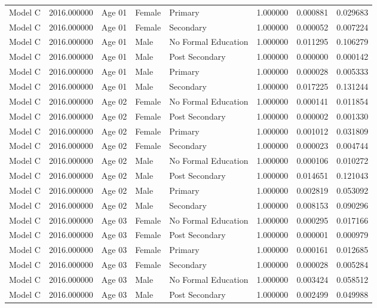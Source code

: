 \begin{table}[ht]
\begin{tabular}{lrlllrrr}
Model C & 2016.000000 & Age 01 & Female & Primary & 1.000000 & 0.000881 & 0.029683 \\
Model C & 2016.000000 & Age 01 & Female & Secondary & 1.000000 & 0.000052 & 0.007224 \\
Model C & 2016.000000 & Age 01 & Male & No Formal Education & 1.000000 & 0.011295 & 0.106279 \\
Model C & 2016.000000 & Age 01 & Male & Post Secondary & 1.000000 & 0.000000 & 0.000142 \\
Model C & 2016.000000 & Age 01 & Male & Primary & 1.000000 & 0.000028 & 0.005333 \\
Model C & 2016.000000 & Age 01 & Male & Secondary & 1.000000 & 0.017225 & 0.131244 \\
Model C & 2016.000000 & Age 02 & Female & No Formal Education & 1.000000 & 0.000141 & 0.011854 \\
Model C & 2016.000000 & Age 02 & Female & Post Secondary & 1.000000 & 0.000002 & 0.001330 \\
Model C & 2016.000000 & Age 02 & Female & Primary & 1.000000 & 0.001012 & 0.031809 \\
Model C & 2016.000000 & Age 02 & Female & Secondary & 1.000000 & 0.000023 & 0.004744 \\
Model C & 2016.000000 & Age 02 & Male & No Formal Education & 1.000000 & 0.000106 & 0.010272 \\
Model C & 2016.000000 & Age 02 & Male & Post Secondary & 1.000000 & 0.014651 & 0.121043 \\
Model C & 2016.000000 & Age 02 & Male & Primary & 1.000000 & 0.002819 & 0.053092 \\
Model C & 2016.000000 & Age 02 & Male & Secondary & 1.000000 & 0.008153 & 0.090296 \\
Model C & 2016.000000 & Age 03 & Female & No Formal Education & 1.000000 & 0.000295 & 0.017166 \\
Model C & 2016.000000 & Age 03 & Female & Post Secondary & 1.000000 & 0.000001 & 0.000979 \\
Model C & 2016.000000 & Age 03 & Female & Primary & 1.000000 & 0.000161 & 0.012685 \\
Model C & 2016.000000 & Age 03 & Female & Secondary & 1.000000 & 0.000028 & 0.005284 \\
Model C & 2016.000000 & Age 03 & Male & No Formal Education & 1.000000 & 0.003424 & 0.058512 \\
Model C & 2016.000000 & Age 03 & Male & Post Secondary & 1.000000 & 0.002499 & 0.049988 \\

\end{tabular}
\end{table}

